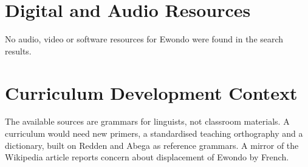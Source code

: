 \documentclass[12pt]{article}
\begin{document}
\section{Digital and Audio Resources}
No audio, video or software resources for Ewondo were found in the search results.

\section{Curriculum Development Context}
The available sources are grammars for linguists, not classroom materials. A curriculum would need new primers, a standardised teaching orthography and a dictionary, built on Redden and Abega as reference grammars. A mirror of the Wikipedia article reports concern about displacement of Ewondo by French.
\end{document}
